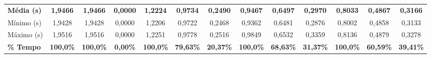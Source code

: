 \documentclass[12pt, a4paper, twoside, chapter=TITLE, subsection=TITLE, section=TITLE, subsubsection=TITLE, english, brazil]{abntex2}
\begin{document}
\begin{table}[htbp]
{\begin{tabular}{lcccccccccccc}
\midrule
\textbf{Média (s)} & \textbf{1,9466} & \textbf{1,9466} & \textbf{0,0000} & \textbf{1,2224} & \textbf{0,9734} & \textbf{0,2490} & \textbf{0,9467} & \textbf{0,6497} & \textbf{0,2970} & \textbf{0,8033} & \textbf{0,4867} & \textbf{0,3166} \\
Mínimo (s) & 1,9428 & 1,9428 & 0,0000 & 1,2206 & 0,9722 & 0,2468 & 0,9362 & 0,6481 & 0,2876 & 0,8002 & 0,4858 & 0,3133 \\
Máximo (s) & 1,9516 & 1,9516 & 0,0000 & 1,2251 & 0,9778 & 0,2516 & 0,9849 & 0,6532 & 0,3359 & 0,8136 & 0,4879 & 0,3278 \\
\textbf{\% Tempo} & \textbf{100,0\%} & \textbf{100,0\%} & \textbf{0,00\%} & \textbf{100,0\%} & \textbf{79,63\%} & \textbf{20,37\%} & \textbf{100,0\%} & \textbf{68,63\%} & \textbf{31,37\%} & \textbf{100,0\%} & \textbf{60,59\%} & \textbf{39,41\%} \\
\bottomrule
\end{tabular}%
}
\end{table}
\end{document}
